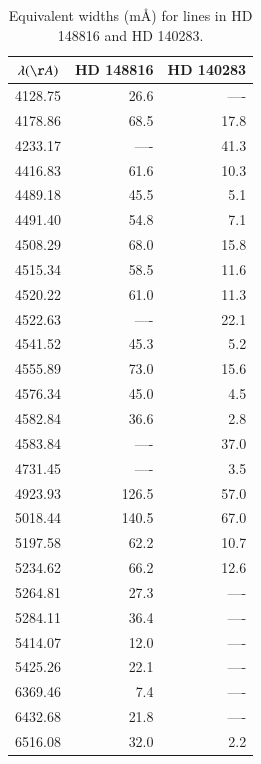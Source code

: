 \documentclass[traditabstract]{aa} %
\begin{document}
\begin{table}
\caption{Equivalent widths (m\AA) for  lines in HD 148816 and HD 140283.}
\label{ewhires}
\centering          
\renewcommand{\footnoterule}{}  %
\begin{tabular}{crr} 
\hline\hline                
$\lambda (\AA)$  & HD 148816 & HD 140283 \\
\hline    
   4128.75 &   26.6 &  ---- \\
   4178.86 &   68.5 &  17.8 \\
   4233.17 &   ---- &  41.3 \\
   4416.83 &   61.6 &  10.3 \\
   4489.18 &   45.5 &   5.1 \\
   4491.40 &   54.8 &   7.1 \\
   4508.29 &   68.0 &  15.8 \\
   4515.34 &   58.5 &  11.6 \\
   4520.22 &   61.0 &  11.3 \\
   4522.63 &   ---- &  22.1 \\
   4541.52 &   45.3 &   5.2 \\
   4555.89 &   73.0 &  15.6 \\
   4576.34 &   45.0 &   4.5 \\
   4582.84 &   36.6 &   2.8 \\
   4583.84 &   ---- &  37.0 \\
   4731.45 &   ---- &   3.5 \\
   4923.93 &  126.5 &  57.0 \\
   5018.44 &  140.5 &  67.0 \\
   5197.58 &   62.2 &  10.7 \\
   5234.62 &   66.2 &  12.6 \\
   5264.81 &   27.3 &  ---- \\
   5284.11 &   36.4 &  ---- \\
   5414.07 &   12.0 &  ---- \\
   5425.26 &   22.1 &  ---- \\
   6369.46 &    7.4 &  ---- \\
   6432.68 &   21.8 &  ---- \\
   6516.08 &   32.0 &   2.2 \\
\hline                                 
\hline                                 
\end{tabular}
\end{table}
           
\end{document}
